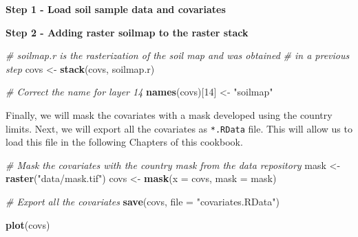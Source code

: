 \documentclass[10pt,b5paper,]{book}
\newenvironment{Shaded}{\begin{snugshade}}{\end{snugshade}}
\newcommand{\CommentTok}[1]{\textcolor[rgb]{0.56,0.35,0.01}{\textit{#1}}}
\newcommand{\DataTypeTok}[1]{\textcolor[rgb]{0.13,0.29,0.53}{#1}}
\newcommand{\DecValTok}[1]{\textcolor[rgb]{0.00,0.00,0.81}{#1}}
\newcommand{\KeywordTok}[1]{\textcolor[rgb]{0.13,0.29,0.53}{\textbf{#1}}}
\newcommand{\NormalTok}[1]{#1}
\newcommand{\OtherTok}[1]{\textcolor[rgb]{0.56,0.35,0.01}{#1}}
\newcommand{\StringTok}[1]{\textcolor[rgb]{0.31,0.60,0.02}{#1}}
\theoremstyle{definition}
\theoremstyle{definition}
\theoremstyle{definition}
\theoremstyle{remark}
\begin{document}
\textbf{Step 1 - Load soil sample data and covariates}

\begin{Shaded}
\end{Shaded}

\textbf{Step 2 - Adding raster soilmap to the raster stack}

\begin{Shaded}
\begin{Highlighting}[]
\CommentTok{# soilmap.r is the rasterization of the soil map and was obtained}
\CommentTok{# in a previous step}
\NormalTok{covs <-}\StringTok{ }\KeywordTok{stack}\NormalTok{(covs, soilmap.r)}

\CommentTok{# Correct the name for layer 14}
\KeywordTok{names}\NormalTok{(covs)[}\DecValTok{14}\NormalTok{] <-}\StringTok{ "soilmap"}
\end{Highlighting}
\end{Shaded}

Finally, we will mask the covariates with a mask developed using the
country limits. Next, we will export all the covariates as
\texttt{*.RData} file. This will allow us to load this file in the
following Chapters of this cookbook.

\begin{Shaded}
\begin{Highlighting}[]
\CommentTok{# Mask the covariates with the country mask from the data repository}
\NormalTok{mask <-}\StringTok{ }\KeywordTok{raster}\NormalTok{(}\StringTok{"data/mask.tif"}\NormalTok{)}
\NormalTok{covs <-}\StringTok{ }\KeywordTok{mask}\NormalTok{(}\DataTypeTok{x =}\NormalTok{ covs, }\DataTypeTok{mask =}\NormalTok{ mask)}

\CommentTok{# Export all the covariates }
\KeywordTok{save}\NormalTok{(covs, }\DataTypeTok{file =} \StringTok{"covariates.RData"}\NormalTok{)}

\KeywordTok{plot}\NormalTok{(covs)}
\end{Highlighting}
\end{Shaded}
\end{document}
